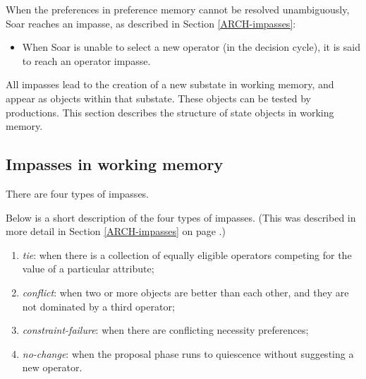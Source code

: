 When the preferences in preference memory cannot be resolved unambiguously,
Soar reaches an impasse, as described in Section \ref{ARCH-impasses}:
\vspace{-12pt}
\begin{itemize}
\item When Soar is unable to select a new operator (in the decision cycle), it
        is said to reach an operator impasse.
\end{itemize}\vspace{-8pt}

All impasses lead to the creation of a new substate in working memory, and appear 
as objects within that substate. These objects can be tested by productions.
This section describes the structure of state objects in working memory.

\subsection{Impasses in working memory}
\label{SYNTAX-impasseaug}       %

There are four types of impasses. 

Below is a short description of the four types of impasses. (This was
described in more detail in Section \ref{ARCH-impasses} on page
\pageref{ARCH-impasses}.)

\vspace{-12pt}
\begin{enumerate}
\item \emph{tie}: when there is a collection of equally eligible operators
        competing for the value of a particular attribute;\vspace{-8pt}
\item \emph{conflict}: when two or more objects are better than each other,
        and they are not dominated by a third operator;\vspace{-8pt}
\item \emph{constraint-failure}: when there are conflicting necessity
        preferences; \vspace{-8pt}
\item \emph{no-change}: when the proposal phase runs to quiescence without 
        suggesting a new operator.
\end{enumerate}

